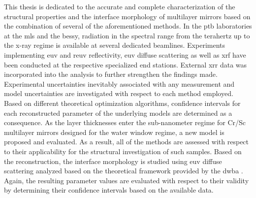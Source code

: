 This thesis is dedicated to the accurate and complete characterization of the structural properties and the interface morphology of multilayer mirrors based on the combination of several of the aforementioned methods. In the \gls{ptb} laboratories at the \gls{mls} and the \gls{bessy}, radiation in the spectral range from the terahertz up to the x-ray regime is available at several dedicated beamlines. Experiments implementing \gls{euv} and \gls{reuv} reflectivity, \gls{euv} diffuse scattering as well as \gls{xrf} have been conducted at the respective specialized end stations. External \gls{xrr} data was incorporated into the analysis to further strengthen the findings made. Experimental uncertainties inevitably associated with any measurement and model uncertainties are investigated with respect to each method employed. Based on different theoretical optimization algorithms, confidence intervals for each reconstructed parameter of the underlying models are determined as a consequence. As the layer thicknesses enter the sub-nanometer regime for Cr/Sc multilayer mirrors designed for the water window regime, a new model is proposed and evaluated. As a result, all of the methods are assessed with respect to their applicability for the structural investigation of such samples. Based on the reconstruction, the interface morphology is studied using \gls{euv} diffuse scattering analyzed based on the theoretical framework provided by the \gls{dwba} \cite{holy_nonspecular_1994, holy_x-ray_1993}. Again, the resulting parameter values are evaluated with respect to their validity by determining their confidence intervals based on the available data.

